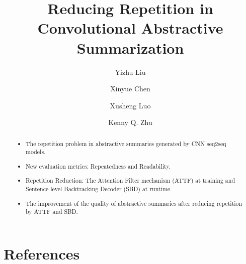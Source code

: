 \documentclass[review]{elsarticle}
\theoremstyle{definition}
\begin{document}
\begin{frontmatter}

\title{Reducing Repetition in Convolutional Abstractive Summarization}

\author[mymainaddress]{Yizhu Liu}
\author[mymainaddress]{Xinyue Chen} 
\author[mysecondaryaddress]{Xusheng Luo} 
\author[mymainaddress]{Kenny Q. Zhu}
\address[mymainaddress]{Department of Computer Science and Engineering, Shanghai Jiao Tong University, Shanghai, China}
\address[mysecondaryaddress]{Search and Recommendation Team, Alibaba Group,
Hangzhou, China}

\begin{abstract}
\begin{itemize}
\item[]	The repetition problem in abstractive summaries generated by CNN seq2seq models.
\item[] New evaluation metrics: Repeatedness and Readability. 
\item[] Repetition Reduction: The Attention Filter mechanism (ATTF) at training and Sentence-level Backtracking Decoder (SBD) at runtime.
\item[] The improvement of the quality of abstractive summaries after reducing repetition by ATTF and SBD.
\end{itemize}
\end{abstract}
\end{frontmatter}
\linenumbers






\section*{References}


\end{document}

